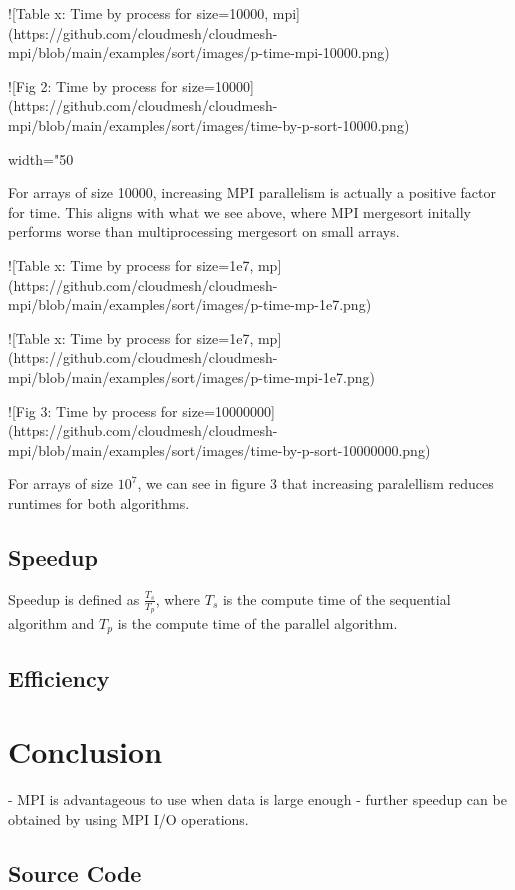 ![Table x: Time by process for size=10000, mpi](https://github.com/cloudmesh/cloudmesh-mpi/blob/main/examples/sort/images/p-time-mpi-10000.png)

![Fig 2: Time by process for size=10000](https://github.com/cloudmesh/cloudmesh-mpi/blob/main/examples/sort/images/time-by-p-sort-10000.png){width="50%

For arrays of size 10000, increasing MPI parallelism is actually a positive factor for time. This aligns with what we see above, where MPI mergesort initally performs worse than multiprocessing mergesort on small arrays. 

![Table x: Time by process for size=1e7, mp](https://github.com/cloudmesh/cloudmesh-mpi/blob/main/examples/sort/images/p-time-mp-1e7.png)

![Table x: Time by process for size=1e7, mp](https://github.com/cloudmesh/cloudmesh-mpi/blob/main/examples/sort/images/p-time-mpi-1e7.png)

![Fig 3: Time by process for size=10000000](https://github.com/cloudmesh/cloudmesh-mpi/blob/main/examples/sort/images/time-by-p-sort-10000000.png)

For arrays of size $10^7$, we can see in figure 3 that increasing paralellism reduces runtimes for both algorithms. 

\subsection{Speedup}

Speedup is defined as $\frac{T_s}{T_p}$, where $T_s$ is the compute time of the sequential algorithm and $T_p$ is the compute time of the parallel algorithm. 

\subsection{Efficiency}

\section{Conclusion}

- MPI is advantageous to use when data is large enough
- further speedup can be obtained by using MPI I/O operations. 

\subsection{Source Code}

}
